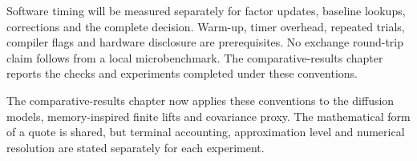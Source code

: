 Software timing will be measured separately for factor updates, baseline lookups, corrections and the complete decision. Warm-up, timer overhead, repeated trials, compiler flags and hardware disclosure are prerequisites. No exchange round-trip claim follows from a local microbenchmark. The comparative-results chapter reports the checks and experiments completed under these conventions.

The comparative-results chapter now applies these conventions to the diffusion models, memory-inspired finite lifts and covariance proxy. The mathematical form of a quote is shared, but terminal accounting, approximation level and numerical resolution are stated separately for each experiment.
